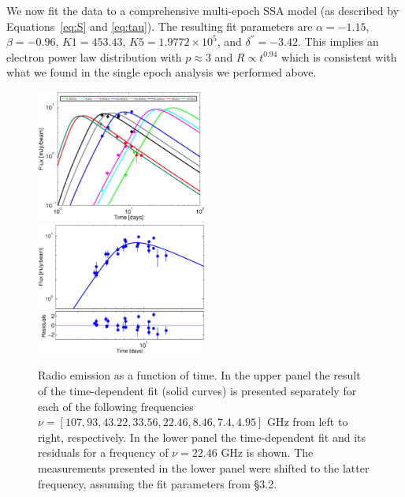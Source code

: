 \documentclass{emulateapj}
\begin{document}
We now fit the data to a comprehensive multi-epoch SSA model (as
described by Equations~\ref{eq:S} and \ref{eq:tau}). The resulting fit parameters are
$\alpha=-1.15$, $\beta=-0.96$, $K1=453.43$, $K5=1.9772\times 10^{5}$, and
$\delta^{''}=-3.42$. This implies an electron power law distribution with 
$p\approx3$ and $R\propto t^{0.94}$ which is consistent with what we found in the single epoch
analysis we performed above.
\begin{figure}
\centering
 \includegraphics[width=0.5\textwidth]{RSN_time_plot_new_legend.eps}
 \includegraphics[width=0.5\textwidth]{RSN_fit_res_new.eps}

\caption{Radio emission as a function of time. In the upper panel the
  result of the time-dependent fit (solid curves) is presented separately for each
  of the following frequencies
  $\nu=[107, 93, 43.22, 33.56, 22.46, 8.46, 7.4, 4.95]$ GHz from left to
  right, respectively. In the lower panel the time-dependent fit and
  its residuals for a frequency of $\nu=22.46$ GHz is shown. The measurements
  presented in the lower panel were shifted to the latter frequency,
  assuming the fit parameters from \S 3.2.}
\end{figure}
\end{document}
